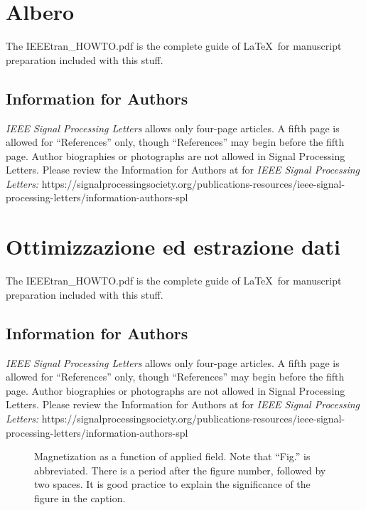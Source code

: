 \documentclass[journal]{IEEEtran}
\begin{document}
\section{Albero}


The IEEEtran\_HOWTO.pdf is the complete guide of \LaTeX\ for manuscript preparation included with this stuff. 


\subsection{Information for Authors}

{\em IEEE Signal Processing Letters} allows only four-page articles. A fifth page is allowed for ``References'' only, though ``References'' may begin before the fifth page. Author biographies or photographs are not allowed in Signal Processing Letters. Please review the Information for Authors at for {\em IEEE Signal Processing Letters:} https://signalprocessingsociety.org/publications-resources/ieee-signal-processing-letters/information-authors-spl

\section{Ottimizzazione ed estrazione dati}


The IEEEtran\_HOWTO.pdf is the complete guide of \LaTeX\ for manuscript preparation included with this stuff. 


\subsection{Information for Authors}

{\em IEEE Signal Processing Letters} allows only four-page articles. A fifth page is allowed for ``References'' only, though ``References'' may begin before the fifth page. Author biographies or photographs are not allowed in Signal Processing Letters. Please review the Information for Authors at for {\em IEEE Signal Processing Letters:} https://signalprocessingsociety.org/publications-resources/ieee-signal-processing-letters/information-authors-spl

\begin{figure}
\caption{Magnetization as a function of applied field. Note that ``Fig.'' is abbreviated. There is a period after the figure number, followed by two spaces. It is good practice to explain the significance of the figure in the caption.}
\end{figure}
\end{document}
